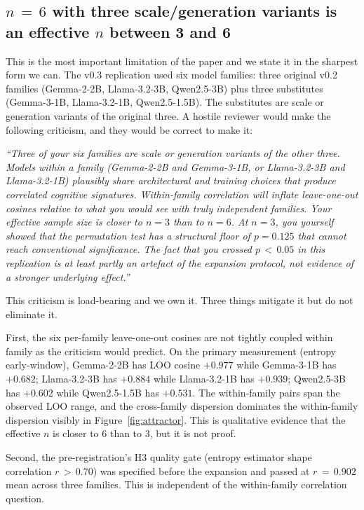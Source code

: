 \documentclass[11pt,letterpaper]{article}
\begin{document}
\subsection{$n\,=\,6$ with three scale/generation variants is an
effective $n$ between 3 and 6}
\label{sec:lim-n6}

This is the most important limitation of the paper and we state it in
the sharpest form we can. The v0.3 replication used six model families:
three original v0.2 families (Gemma-2-2B, Llama-3.2-3B, Qwen2.5-3B) plus
three substitutes (Gemma-3-1B, Llama-3.2-1B, Qwen2.5-1.5B). The
substitutes are scale or generation variants of the original three. A
hostile reviewer would make the following criticism, and they would be
correct to make it:

\emph{``Three of your six families are scale or generation variants of
the other three. Models within a family (Gemma-2-2B and Gemma-3-1B, or
Llama-3.2-3B and Llama-3.2-1B) plausibly share architectural and training
choices that produce correlated cognitive signatures. Within-family
correlation will inflate leave-one-out cosines relative to what you
would see with truly independent families. Your effective sample size
is closer to $n=3$ than to $n=6$. At $n=3$, you yourself showed that
the permutation test has a structural floor of $p\!=\!0.125$ that cannot
reach conventional significance. The fact that you crossed $p\,<\,0.05$
in this replication is at least partly an artefact of the expansion
protocol, not evidence of a stronger underlying effect.''}

This criticism is load-bearing and we own it. Three things mitigate it
but do not eliminate it.

First, the six per-family leave-one-out cosines are not tightly coupled
within family as the criticism would predict. On the primary measurement
(entropy early-window), Gemma-2-2B has LOO cosine $+0.977$ while
Gemma-3-1B has $+0.682$; Llama-3.2-3B has $+0.884$ while Llama-3.2-1B
has $+0.939$; Qwen2.5-3B has $+0.602$ while Qwen2.5-1.5B has $+0.531$.
The within-family pairs span the observed LOO range, and the
cross-family dispersion dominates the within-family dispersion visibly
in Figure~\ref{fig:attractor}. This is qualitative evidence that the
effective $n$ is closer to $6$ than to $3$, but it is not proof.

Second, the pre-registration's H3 quality gate (entropy estimator shape
correlation $r\,>\,0.70$) was specified before the expansion and passed
at $r\,=\,0.902$ mean across three families. This is independent of the
within-family correlation question.
\end{document}
